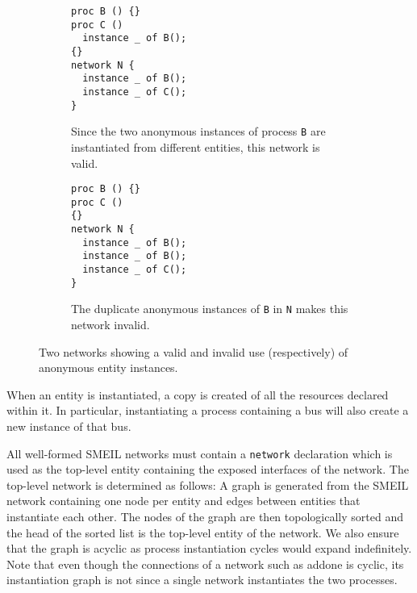 \begin{figure}
  \centering
  \begin{subfigure}[t]{0.40\textwidth}
\begin{lstlisting}[language=smeil]
proc B () {}
proc C ()
  instance _ of B();
{}
network N {
  instance _ of B();
  instance _ of C();
}
\end{lstlisting}
    \caption{Since the two anonymous instances of process {\tt B} are
      instantiated from different entities, this network is valid.}
    \label{fig:ambigvalid}
    \hspace{4mm}
\end{subfigure}
\begin{subfigure}[t]{0.40\textwidth}
\begin{lstlisting}[language=smeil]
proc B () {}
proc C ()
{}
network N {
  instance _ of B();
  instance _ of B();
  instance _ of C();
}
\end{lstlisting}
    \caption{The duplicate anonymous instances of {\tt B} in {\tt N} makes this
      network invalid.}
  \end{subfigure}

  \caption{Two networks showing a valid and invalid use (respectively) of
  anonymous entity instances.}
\label{fig:anonproc}
\end{figure}

When an entity is instantiated, a copy is created of all the resources declared
within it. In particular, instantiating a process containing a bus will also
create a new instance of that bus.

All well-formed SMEIL networks must contain a {\tt network} declaration which is
used as the top-level entity containing the exposed interfaces of the
network. The top-level network is determined as follows: A graph is generated
from the SMEIL network containing one node per entity and edges between entities
that instantiate each other. The nodes of the graph are then topologically
sorted and the head of the sorted list is the top-level entity of the
network. We also ensure that the graph is acyclic as process instantiation
cycles would expand indefinitely. Note that even though the connections of a
network such as {\sc addone} is cyclic, its instantiation graph is not since a
single network instantiates the two processes.


